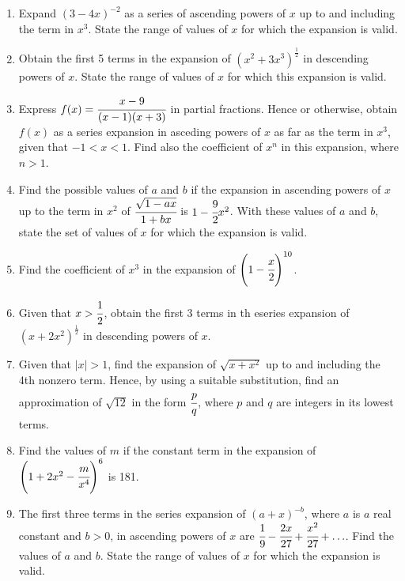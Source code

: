 \documentclass[letterpaper]{article}
\begin{document}
\begin{enumerate}
\item Expand $(3 - 4x)^{-2}$ as a series of ascending powers of $x$ up to and including the term in $x^3$. State the range of values of $x$ for which the expansion is valid.

\item Obtain the first 5 terms in the expansion of $(x^2 + 3x^3)^{\frac{1}{2}}$ in descending powers of $x$. State the range of values of $x$ for which this expansion is valid.

\item Express $f(x) = \cfrac{x-9}{(x-1)(x+3)}$ in partial fractions. Hence or otherwise, obtain $f(x)$ as a series expansion in asceding powers of $x$ as far as the term in $x^3$, given that $-1 < x < 1$. Find also the coefficient of $x^n$ in this expansion, where $n > 1$.

\item Find the possible values of $a$ and $b$ if the expansion in ascending powers of $x$ up to the term in $x^2$ of $\cfrac{\sqrt{1-ax}}{1 + bx}$ is $1 - \cfrac{9}{2} x^2$. With these values of $a$ and $b$, state the set of values of $x$ for which the expansion is valid.

\item Find the coefficient of $x^3$ in the expansion of $\left(1 - \cfrac{x}{2}\right)^{10}$.

\item Given that $x > \cfrac{1}{2}$, obtain the first 3 terms in th eseries expansion of $(x + 2x^2)^{\frac{1}{2}}$ in descending powers of $x$.

\item Given that $|x|>1$, find the expansion of $\sqrt{x + x^2}$ up to and including the 4th nonzero term. Hence, by using a suitable substitution, find an approximation of $\sqrt{12}$ in the form $\cfrac{p}{q}$, where $p$ and $q$ are integers in its lowest terms.

\item Find the values of $m$ if the constant term in the expansion of $\left(1 + 2x^2 - \cfrac{m}{x^4}\right)^6$ is 181.

\item The first three terms in the series expansion of $(a+x)^{-b}$, where $a$ is $a$ real constant and $b>0$, in ascending powers of $x$ are $\cfrac{1}{9} - \cfrac{2x}{27} + \cfrac{x^2}{27} + \ldots$. Find the values of $a$ and $b$. State the range of values of $x$ for which the expansion is valid.
\end{enumerate}
\end{document}
